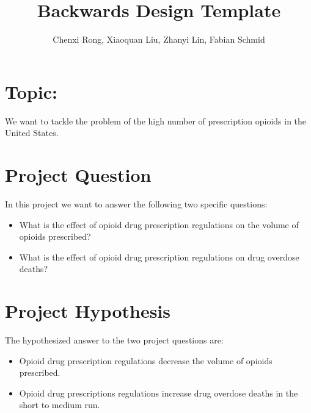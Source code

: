 \documentclass[12pt]{article}
\author{Chenxi Rong, Xiaoquan Liu, Zhanyi Lin, Fabian Schmid}
\title{Backwards Design Template}
\begin{document}
\maketitle

\section{Topic:}


We want to tackle the problem of the high number of prescription opioids in the United States. 
\vspace*{1cm}\\

\section{Project Question}
In this project we want to answer the following two specific questions: 
\begin{itemize}
\item What is the effect of opioid drug prescription regulations on the volume of opioids prescribed?

\item What is the effect of opioid drug prescription regulations on drug overdose deaths?

\end{itemize}

\vspace*{1cm}
\section{Project Hypothesis}

The hypothesized answer to the two project questions are:
\begin{itemize}
\item Opioid drug prescription regulations decrease the volume of opioids prescribed.

\item Opioid drug prescriptions regulations increase drug overdose deaths in the short to medium run.
\end{itemize}

\vspace*{1cm}
\end{document}
